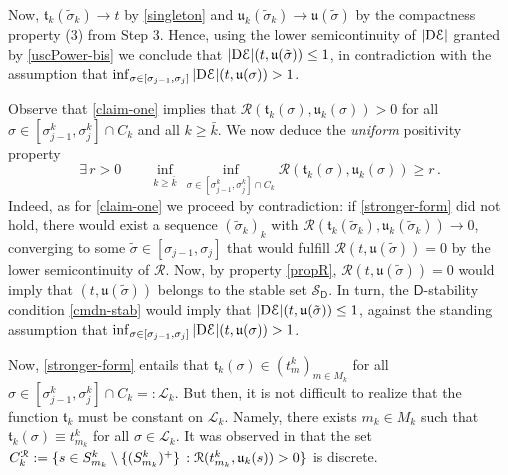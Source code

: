 \documentclass[a4paper,10pt,reqno]{amsart} %
\numberwithin{equation}{section}
\def\rmD{{\mathrm D}} \def\rmE{{\mathrm E}} \def\rmF{{\mathrm F}}
\newcommand{\rstab}[2]{\mathcal{R}(#1,#2)}
\newcommand{\slope}[3]{|\rmD {#1}|(#2,#3)}
\newcommand{\ninvresc}[1]{\mathfrak{t}_{#1}}
\newcommand{\invcur}[1]{\mathfrak{u}_{#1}}
\newcommand{\invcu}{\mathfrak{u}}
\begin{document}
Now,  $\ninvresc k (\tilde{\sigma}_k) \to t$ by \eqref{singleton} and $\invcur k (\tilde{\sigma}_k) \to \invcu(\tilde\sigma)$ by the
compactness property (3) from Step $3$. Hence,  using the lower semicontinuity of $|\mathrm{D}{\mathcal E}|$ granted by \eqref{uscPower-bis} we conclude that 
$\slope \calE {t}{\invcu(\tilde\sigma)} \leq1$, in contradiction with the assumption that
 $\inf_{\sigma \in [\sigma_{j-1},\sigma_j]}\slope \calE t{\invcu(\sigma)}  > 1 $. 
\par
 Observe that \eqref{claim-one} implies that $\rstab{\ninvresc k (\sigma)}{\invcur k(\sigma)}>0 $
for all $ \sigma \in  [\sigma_{j-1}^k,\sigma_j^k] \cap C_k $ and all $ k \geq \bar k. $
We now  deduce    the \emph{uniform} positivity property
\begin{equation}
\label{stronger-form}
\exists\, r>0 \qquad \inf_{k \geq \bar{k}}\, \inf_{\sigma \in  [\sigma_{j-1}^k,\sigma_j^k] {\cap} C_k} \rstab{\ninvresc k (\sigma)}{\invcur k(\sigma)} \geq r\,.
\end{equation}
Indeed,    as for \eqref{claim-one}
we proceed by contradiction: if \eqref{stronger-form} did not hold, there would exist a 
 sequence
  $(\tilde{\sigma}_k )_k$  with $ \rstab{\ninvresc k (\tilde{\sigma}_k)}{\invcur k(\tilde{\sigma}_k)} \to 0$, converging 
  to some $\tilde \sigma \in  [\sigma_{j-1},\sigma_j]$ that would fulfill $\rstab{t}{\invcu (\tilde\sigma)}=0$ by the lower semicontinuity of $\mathcal{R}$.  Now, 
   by property  \eqref{propR},  $\rstab{t}{\invcu (\tilde\sigma)}=0$  
  would  imply that $(t,\invcu(\tilde\sigma)) $
 belongs to the stable set $\mathscr{S}_{\mathsf{D}}$. In turn,  the $\mathsf{D}$-stability condition \eqref{cmdn-stab}  would imply that $\slope \calE {t}{\invcu (\tilde\sigma)}\leq 1$, against the standing assumption that  $\inf_{\sigma \in [\sigma_{j-1},\sigma_j]}\slope \calE t{\invcu(\sigma)}  > 1 $.
\par
Now, \eqref{stronger-form} 
 entails that $\ninvresc k (\sigma) \in (t_m^k)_{m\in M_k}$
for all $ \sigma \in  [\sigma_{j-1}^k,\sigma_j^k] \cap C_k =:  \mathscr{L}_k$. But then,
it is not difficult to realize that the function  $\ninvresc k$ must be constant on 
$ \mathscr{L}_k$. Namely, there exists ${m}_k \in M_k$ such that 
$\ninvresc k (\sigma) \equiv t_{{m}_k}^k$ for all $\sigma \in  \mathscr{L}_k$. 
It was observed in 
\cite[Rmk.\ 3.15]{SavMin16} that the set
$
C_{k}^{\calR}: = \{ s \in S_{{m}_k}^k\setminus \{(S_{{m}_k}^k)^+\}\, : \rstab {t_{{m}_k}^k}{\invcur k(s)}>0\}  $  is discrete. 
\end{document}
